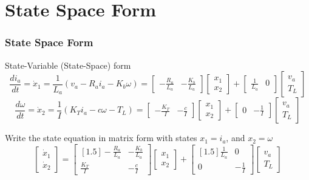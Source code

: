 \documentclass[fleqn]{beamer}                  %
\newcommand{\sectiontitleIII}{State Space Form}
\begin{document}
	\section{\sectiontitleIII}

	\begin{frame} \small
		\frametitle{\sectiontitleIII}

		State-Variable (State-Space) form
		\[\renewcommand*{\arraystretch}{1.5}
		  \frac{di_a}{dt}=\dot{x}_1=\frac{1}{L_a}\left( v_a -R_ai_a-K_b\omega\right)
		  = \begin{bmatrix} -\frac{R_a}{L_a} & -\frac{K_b}{L_a} \end{bmatrix}
		  \begin{bmatrix} x_1 \\ x_2 \end{bmatrix}
		  +\begin{bmatrix} \frac{1}{L_a} & 0 \end{bmatrix}
		  \begin{bmatrix} v_a \\ T_L \end{bmatrix}
		\]
		\[
		  \frac{d\omega}{dt}=\dot{x}_2=\frac{1}{I}\left( K_Ti_a-c\omega-T_L\right)	
		  = \begin{bmatrix} -\frac{K_T}{I} & -\frac{c}{I} \end{bmatrix}
		  \begin{bmatrix} x_1 \\ x_2 \end{bmatrix}
		  +\begin{bmatrix} 0 & -\frac{1}{I} \end{bmatrix}
		  \begin{bmatrix} v_a \\ T_L \end{bmatrix}
		\]

		Write the state equation in matrix form with states $x_1=i_a$, and $x_2=\omega$
		\[
		  \begin{bmatrix}\dot{x}_1 \\ \dot{x}_2\end{bmatrix} 
		  =\begin{bmatrix}[1.5] -\frac{R_a}{L_a} & -\frac{K_b}{L_a} \\ \frac{K_T}{I} & -\frac{c}{I}\end{bmatrix}
		  \begin{bmatrix} x_1 \\ x_2\end{bmatrix}
		  +\begin{bmatrix}[1.5] \frac{1}{L_a} & 0 \\ 0 & -\frac{1}{I}\end{bmatrix}
		  \begin{bmatrix}v_a \\T_L \end{bmatrix}
        \]

	\end{frame}	
\end{document}
